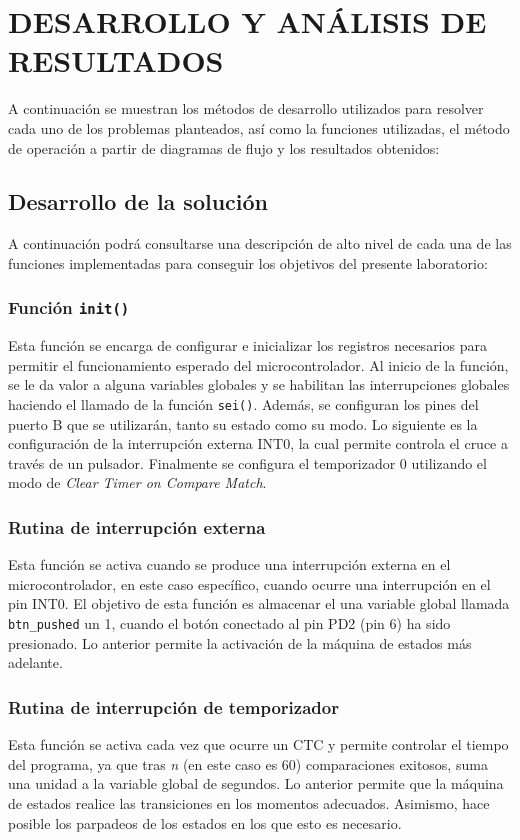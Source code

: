 \newpage
\section{DESARROLLO Y ANÁLISIS DE RESULTADOS}

A continuación se muestran los métodos de desarrollo utilizados para resolver cada uno de los problemas planteados, así como la funciones utilizadas, el método de operación a partir de diagramas de flujo y los resultados obtenidos:

\subsection{Desarrollo de la solución}

A continuación podrá consultarse una descripción de alto nivel de cada una de las funciones implementadas para conseguir los objetivos del presente laboratorio: 

\subsubsection{Función \texttt{init()}}
Esta función se encarga de configurar e inicializar los registros necesarios para permitir el funcionamiento esperado del microcontrolador. Al inicio de la función, se le da valor a alguna variables globales y se habilitan las interrupciones globales haciendo el llamado de la función \texttt{sei()}. Además, se configuran los pines del puerto B que se utilizarán, tanto su estado como su modo. Lo siguiente es la configuración de la interrupción externa INT0, la cual permite controla el cruce a través de un pulsador. Finalmente se configura el temporizador 0 utilizando el modo de \textit{Clear Timer on Compare Match}. 

\subsubsection{Rutina de interrupción externa}
Esta función se activa cuando se produce una interrupción externa en el microcontrolador, en este caso específico, cuando ocurre una interrupción en el pin INT0. El objetivo de esta función es almacenar el una variable global llamada \texttt{btn\_pushed} un 1, cuando el botón conectado al pin PD2 (pin 6) ha sido presionado. Lo anterior permite la activación de la máquina de estados más adelante. 

\subsubsection{Rutina de interrupción de temporizador}
Esta función se activa cada vez que ocurre un CTC y permite controlar el tiempo del programa, ya que tras \textit{n} (en este caso es 60) comparaciones exitosos, suma una unidad a la variable global de segundos. Lo anterior permite que la máquina de estados realice las transiciones en los momentos adecuados. Asimismo, hace posible los parpadeos de los estados en los que esto es necesario.  


